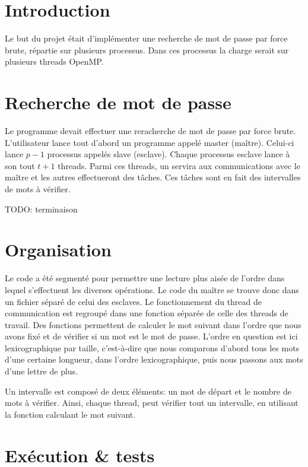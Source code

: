 \section{Introduction} %
\label{sec:introduction}
Le but du projet était d'implémenter une recherche de mot de passe par force brute, répartie sur plusieurs processus. Dans ces processus la charge serait sur plusieurs threads OpenMP.


\section{Recherche de mot de passe} %
\label{sec:recherche_de_mot_de_passe}

Le programme devait effectuer une reracherche de mot de passe par force brute. L'utilisateur lance tout d'abord un programme appelé master (maître). Celui-ci lance $p-1$ processus appelés slave (esclave). Chaque processus esclave lance à son tout $t+1$ threads. Parmi ces threads, un servira aux communications avec le maître et les autres effectueront des tâches. Ces tâches sont en fait des intervalles de mots à vérifier. 

TODO: terminaison

\section{Organisation} %
\label{sec:organisation}

Le code a été segmenté pour permettre une lecture plus aisée de l'ordre dans lequel s'effectuent les diverses opérations. Le code du maître se trouve donc dans un fichier séparé de celui des esclaves. Le fonctionnement du thread de communication est regroupé dans une fonction séparée de celle des threads de travail. Des fonctions permettent de calculer le mot suivant dans l'ordre que nous avons fixé et de vérifier si un mot est le mot de passe. L'ordre en question est ici lexicographique par taille, c'est-à-dire que nous comparons d'abord tous les mots d'une certaine longueur, dans l'ordre lexicographique, puis nous passons aux mots d'une lettre de plus.

Un intervalle est composé de deux éléments: un mot de départ et le nombre de mots à vérifier. Ainsi, chaque thread, peut vérifier tout un intervalle, en utilisant la fonction calculant le mot suivant.

\section{Exécution \& tests} %
\label{sec:execution}

